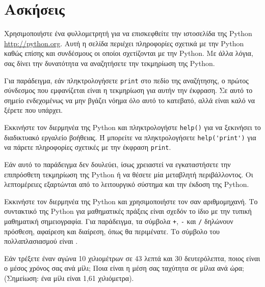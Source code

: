 \documentclass[10pt]{book}
\begin{document}
\section{Ασκήσεις}


\begin{exercise}
Χρησιμοποιήστε ένα φυλλομετρητή για να επισκεφθείτε την ιστοσελίδα της Python \url{http://python.org}. Αυτή η σελίδα περιέχει πληροφορίες σχετικά με την  Python καθώς επίσης και συνδέσμους οι οποίοι σχετίζονται με την Python.
Με άλλα λόγια, σας δίνει την δυνατότητα να αναζητήσετε την τεκμηρίωση της Python.

Για παράδειγμα, εάν πληκτρολογήσετε  {\tt print}  στο πεδίο της
αναζήτησης, ο πρώτος σύνδεσμος που εμφανίζεται είναι η τεκμηρίωση για αυτήν
την έκφραση.  Σε αυτό το σημείο ενδεχομένως να μην βγάζει νόημα όλο αυτό το κατεβατό, αλλά είναι καλό να ξέρετε που υπάρχει.
\\
\end{exercise}


\begin{exercise}
Εκκινήστε τον διερμηνέα της Python και πληκτρολογήστε {\tt help()} 
για να ξεκινήσει το διαδικτυακό εργαλείο βοήθειας.  Ή μπορείτε να πληκτρολογήσετε \verb"help('print')" για να πάρετε πληροφορίες σχετικές με την έκφραση {\tt print}.

Εάν αυτό το παράδειγμα δεν δουλεύει, ίσως χρειαστεί να εγκαταστήσετε την επιπρόσθετη τεκμηρίωση της Python ή να θέσετε μία μεταβλητή περιβάλλοντος. Οι λεπτομέρειες εξαρτώνται από το λειτουργικό σύστημα και την έκδοση της Python. 
\\
\end{exercise}


\begin{exercise}
Εκκινήστε τον διερμηνέα της Python και χρησιμοποιήστε τον
σαν αριθμομηχανή. Το συντακτικό της Python για μαθηματικές
πράξεις είναι σχεδόν το ίδιο με την τυπική μαθηματική σημειογραφία.  
Για παράδειγμα, τα σύμβολα {\tt +}, {\tt -} και {\tt /}
δηλώνουν πρόσθεση, αφαίρεση και διαίρεση, όπως θα περιμένατε.  
Το σύμβολο του πολλαπλασιασμού είναι {\tt *}.  

Εάν τρέξετε έναν αγώνα 10 χιλιομέτρων σε 43 λεπτά και 30 δευτερόλεπτα,
ποιος είναι ο μέσος χρόνος σας ανά μίλι; Ποια είναι η μέση σας ταχύτητα
σε μίλια ανά ώρα; (Σημείωση: ένα μίλι είναι 1,61 χιλιόμετρα).
\end{exercise}
\end{document}
